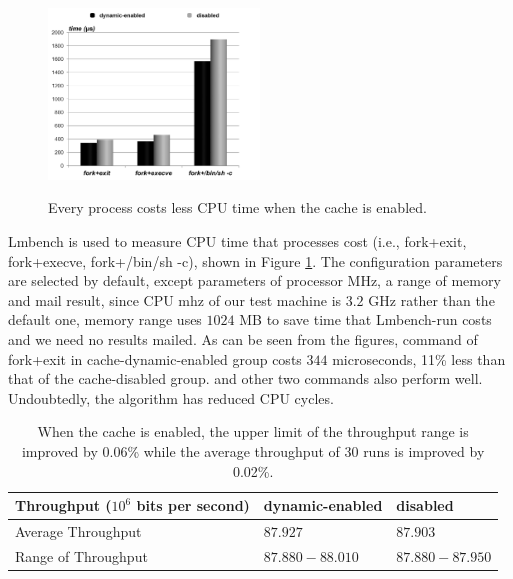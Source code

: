 \begin{figure}[htp]
\centering
\includegraphics[width=0.5\textwidth]{image/macro/lmbench.png} \\
\caption{Every process costs less CPU time when the cache is enabled.}
\label{fig:lmbench}
\end{figure}

Lmbench is used to measure CPU time that processes cost (i.e., fork+exit, fork+execve, fork+/bin/sh -c), shown in Figure \ref{fig:lmbench}. The configuration parameters are selected by default, except parameters of processor MHz, a range of memory and mail result, since CPU mhz of our test machine is $3.2$ GHz rather than the default one, memory range uses $1024$ MB to save time that Lmbench-run costs and we need no results mailed. As can be seen from the figures, command of fork+exit in cache-dynamic-enabled group costs $344$ microseconds, 11\% less than that of the cache-disabled group. and other two commands also perform well. Undoubtedly, the algorithm has reduced CPU cycles.


\begin{table}[!ht]
\footnotesize
\begin{center}
\begin{tabular}{|l|l|l|}
\hline
{\textbf{Throughput ($10^6$ bits per second)}} & {\textbf{dynamic-enabled}} & {\textbf{disabled}}    \\ \hline
Average Throughput &  $87.927$ & $87.903$ \\ \hline
Range of Throughput & $87.880-88.010$ & $87.880-87.950$ \\ \hline
\end{tabular}
\end{center}
\caption{When the cache is enabled, the upper limit of the throughput range is improved by 0.06\% while the average throughput of 30 runs is improved by 0.02\%. }
\label{tab:netperf}
\end{table}

